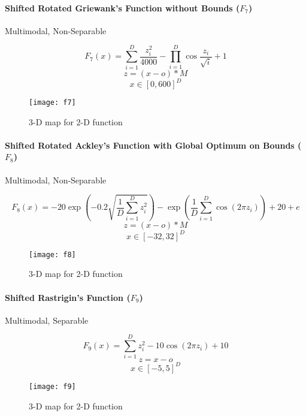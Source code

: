 \paragraph{Shifted Rotated Griewank’s Function without Bounds ($F_7$)} Multimodal, Non-Separable

\begin{minipage}{.5\textwidth}
\[
  F_7(x)=\sum_{i=1}^{D}{\frac{z_i^2}{4000}}-\prod_{i=1}^{D}{\cos{\frac{z_i}{\sqrt{i}}}}+1
\]
\[ z=(x-o)*M \]
\[ x \in [0,600]^D \]
\end{minipage}%
\begin{minipage}{.5\textwidth}
  \begin{figure}[H]
    \centering
    \texttt{[image: f7]}
    \caption{3-D map for 2-D function}
    \label{f7}
  \end{figure}
\end{minipage}

\paragraph{Shifted Rotated Ackley’s Function with Global Optimum on Bounds ($F_8$)} Multimodal, Non-Separable

\begin{minipage}{.5\textwidth}
\[
  F_8(x)=-20\exp{(-0.2\sqrt{\frac{1}{D}\sum_{i=1}^{D}{z_i^2}})}-\exp{(\frac{1}{D}\sum_{i=1}^{D}{\cos{(2\pi z_i)}})} + 20 + e
\]
\[ z=(x-o)*M \]
\[ x \in [-32,32]^D \]
\end{minipage}%
\begin{minipage}{.5\textwidth}
  \begin{figure}[H]
    \centering
    \texttt{[image: f8]}
    \caption{3-D map for 2-D function}
    \label{f8}
  \end{figure}
\end{minipage}

\paragraph{Shifted Rastrigin’s Function ($F_9$)} Multimodal, Separable

\begin{minipage}{.5\textwidth}
\[
  F_9(x)=\sum_{i=1}^{D}{z_i^2 - 10\cos{(2\pi z_i)} + 10}
\]
\[ z=x-o \]
\[ x \in [-5,5]^D \]
\end{minipage}%
\begin{minipage}{.5\textwidth}
  \begin{figure}[H]
    \centering
    \texttt{[image: f9]}
    \caption{3-D map for 2-D function}
    \label{f9}
  \end{figure}
\end{minipage}


